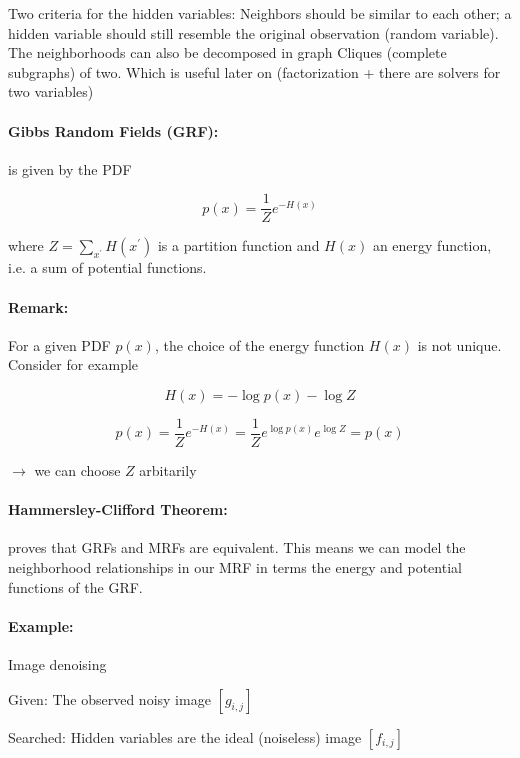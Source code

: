 Two criteria for the hidden variables: Neighbors should be similar to each other; a hidden variable should still resemble the original observation (random variable).
The neighborhoods can also be decomposed in graph Cliques (complete subgraphs) of two. Which is useful later on (factorization + there are solvers for two variables)

\paragraph{Gibbs Random Fields (GRF):} is given by the PDF

\begin{equation*}
	p(x) = \frac{1}{Z} e^{-H(x)}
\end{equation*}

where $Z = \sum_{x^\prime} H(x^{\prime})$ is a partition function and $H(x)$ an energy function, i.e. a sum of potential functions.

\paragraph{Remark:}
For a given PDF $p(x)$, the choice of the energy function $H(x)$ is not unique. Consider for example

\begin{equation*}
	H(x) = - \log p(x) - \log Z
\end{equation*}

\begin{equation*}
	p(x) = \frac{1}{Z} e^{-H(x)} = \frac{1}{Z} e^{\log p(x)} e^{\log Z}  = p(x)
\end{equation*}

$\rightarrow$ we can choose $Z$ arbitarily\\

\paragraph{Hammersley-Clifford Theorem:} proves that GRFs and MRFs are equivalent. This means we can model the neighborhood relationships in our MRF in terms the energy and potential functions of the GRF.

\paragraph{Example:} Image denoising

Given: The observed noisy image $[g_{i,j}]$

Searched: Hidden variables are the ideal (noiseless) image $[f_{i,j}]$\\

